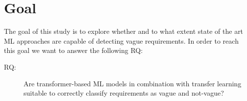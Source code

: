 \section{Goal}
\label{chp:study:sec:goal}
The goal of this study is to explore whether and to what extent state of the art \ac{ML} approaches are capable of detecting vague requirements.
In order to reach this goal we want to answer the following \ac{RQ}:

\begin{description}
    \item[\Ac{RQ}:] Are transformer-based \ac{ML} models in combination with transfer learning suitable to correctly classify requirements as vague and not-vague?
\end{description}

